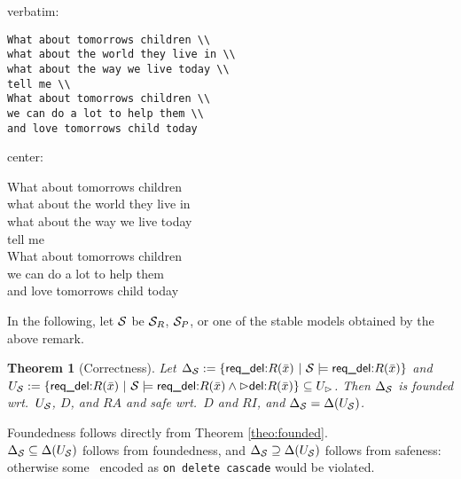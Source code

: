 \documentclass[twoside,11pt]{article}
\newtheorem{Theorem}{Theorem}
\theoremstyle{plain}
\def\rdel{\itorsf{req\_del:}}
\begin{document}
\begin{Lemma} verbatim:
\begin{verbatim}
What about tomorrows children \\
what about the world they live in \\
what about the way we live today \\
tell me \\
What about tomorrows children \\
we can do a lot to help them \\
and love tomorrows child today \end{verbatim}
\end{Lemma}
\begin{Lemma} center:
\begin{center}
What about tomorrows children \\
what about the world they live in \\
what about the way we live today \\
tell me \\
What about tomorrows children \\
we can do a lot to help them \\
and love tomorrows child today
\end{center}
\end{Lemma}

\noindent
In the following, let $\mathcal S$ be $\mathcal S_R$, $\mathcal S_P$, or one of the
stable models obtained by the above remark.

\begin{Theorem}[Correctness]\label{theo:Correctness}
Let
$\Delta_{\pl S} := 
  \{\rdel R(\bar x) \st \pl S \models \rdel R(\bar x)\}$
and 
$U_\pl S:= \{\rdel R(\bar x) \st 
   \pl S \models \rdel R(\bar x) \land \extev \del R(\bar x)\}
  \subseteq U_\rhd$.
%
Then $\Delta_{\mathcal S}$ is founded wrt.\ $U_\mathcal S$, $D$, and $RA$ and
safe wrt.\ $D$ and $RI$, and $\Delta_{\mathcal S} = \Delta(U_\mathcal S)$.
\end{Theorem}
\begin{Proof}
Foundedness follows directly from Theorem \ref{theo:founded}. \\
$\Delta_{\mathcal S} \subseteq \Delta(U_\mathcal S)$ follows from foundedness,
and $\Delta_{\mathcal S} \supseteq \Delta(U_\mathcal S)$ follows from safeness:
otherwise some \ric\ encoded as \texttt{on delete cascade} would be
violated.
\end{Proof}
\end{document}
